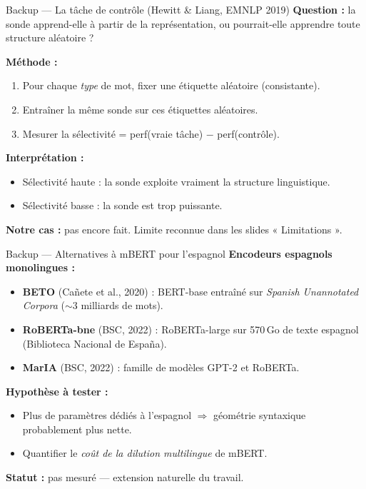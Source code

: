 \documentclass[aspectratio=169,11pt]{beamer}
\begin{document}
\begin{frame}{Backup --- La tâche de contrôle (Hewitt \& Liang, EMNLP 2019)}
  \textbf{Question :} la sonde apprend-elle à partir de la
  représentation, ou pourrait-elle apprendre toute structure aléatoire ?

  \medskip
  \textbf{Méthode :}
  \begin{enumerate}\setlength\itemsep{2pt}
    \item Pour chaque \emph{type} de mot, fixer une étiquette aléatoire (consistante).
    \item Entraîner la même sonde sur ces étiquettes aléatoires.
    \item Mesurer la \alert{sélectivité} = perf(vraie tâche) $-$ perf(contrôle).
  \end{enumerate}

  \medskip
  \textbf{Interprétation :}
  \begin{itemize}\setlength\itemsep{2pt}
    \item Sélectivité haute : la sonde exploite vraiment la structure linguistique.
    \item Sélectivité basse : la sonde est trop puissante.
  \end{itemize}

  \medskip
  \textbf{Notre cas :} pas encore fait. Limite reconnue dans les
  slides « Limitations ».
\end{frame}

\begin{frame}{Backup --- Alternatives à mBERT pour l'espagnol}
  \textbf{Encodeurs espagnols monolingues :}
  \begin{itemize}\setlength\itemsep{3pt}
    \item \textbf{BETO} (Cañete et al., 2020) : BERT-base entraîné sur
          \emph{Spanish Unannotated Corpora} ($\sim 3$ milliards de mots).
    \item \textbf{RoBERTa-bne} (BSC, 2022) : RoBERTa-large sur 570\,Go
          de texte espagnol (Biblioteca Nacional de España).
    \item \textbf{MarIA} (BSC, 2022) : famille de modèles GPT-2 et RoBERTa.
  \end{itemize}

  \vspace{0.4cm}
  \textbf{Hypothèse à tester :}
  \begin{itemize}\setlength\itemsep{2pt}
    \item Plus de paramètres dédiés à l'espagnol $\Rightarrow$ géométrie
          syntaxique probablement plus nette.
    \item Quantifier le \emph{coût de la dilution multilingue} de mBERT.
  \end{itemize}

  \vspace{0.3cm}
  \textbf{Statut :} pas mesuré --- extension naturelle du travail.
\end{frame}
\end{document}
